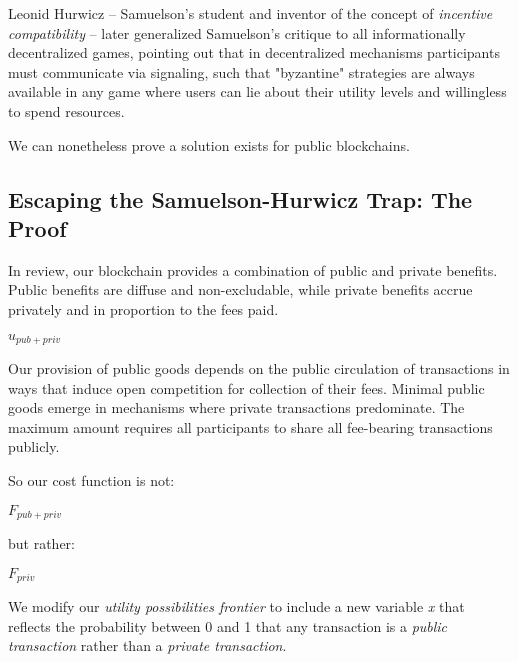 \documentclass[oneside]{article}   	%
\begin{document}
Leonid Hurwicz -- Samuelson's student and inventor of the concept of \textit{incentive compatibility} -- later generalized Samuelson's critique to all informationally decentralized games, pointing out that in decentralized mechanisms participants must communicate via signaling, such that "byzantine" strategies are always available in any game where users can lie about their utility levels and willingless to spend resources.

We can nonetheless prove a solution exists for public blockchains.

\subsection*{Escaping the Samuelson-Hurwicz Trap: The Proof}

In review, our blockchain provides a combination of public and private benefits. Public benefits are diffuse and non-excludable, while private benefits accrue privately and in proportion to the fees paid.

\large
\begin{adjustwidth}{1.5em}{1.5em} 
\begin{math}
{u_{{pub}+{priv}}}
\end{math}
\end{adjustwidth}
\normalsize

Our provision of public goods depends on the public circulation of transactions in ways that induce open competition for collection of their fees. Minimal public goods emerge in mechanisms where private transactions predominate. The maximum amount requires all participants to share all fee-bearing transactions publicly.

So our cost function is not:

\large
\begin{adjustwidth}{1.5em}{1.5em} 
\begin{math}
{F_{{pub}+{priv}}}
\end{math}
\end{adjustwidth}
\normalsize

but rather:

\large
\begin{adjustwidth}{1.5em}{1.5em} 
\begin{math}
{F_{{priv}}}
\end{math}
\end{adjustwidth}
\normalsize

We modify our \textit{utility possibilities frontier} to include a new variable \textit{x} that reflects the probability between 0 and 1 that any transaction is a \textit{public transaction} rather than a \textit{private transaction}.
\end{document}
